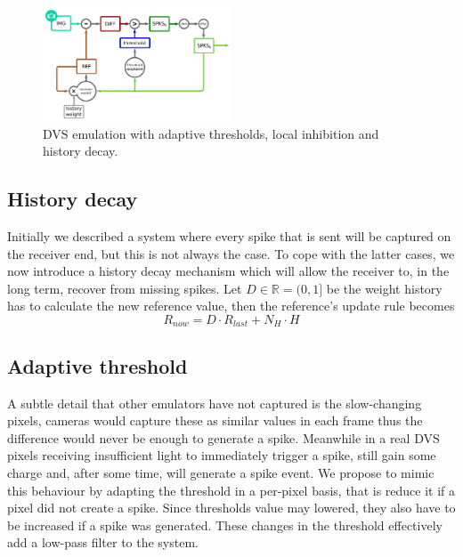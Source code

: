 \documentclass[conference]{IEEEtran}
\begin{document}
\begin{figure}[htb]
  
  \includegraphics[width=0.5\textwidth]{dvs_emu_decay_adapt_inh}
  \caption{DVS emulation with adaptive thresholds, local inhibition and history decay.}
  \label{fig:dvs_emu_inh}
\end{figure}

\subsection{History decay} %

Initially we described a system where every spike that is sent will be captured on the receiver end, but this is not always the case. To cope with the latter cases, we now introduce a history decay mechanism which will allow the receiver to, in the long term, recover from missing spikes. Let $D \in \mathbb{R} = (0, 1]$ be the weight history has to calculate the new reference value, then the reference's update rule becomes
\begin{equation}
\label{eq:ref_update_decay}
R_{now} = D\cdot R_{last} + N_{H}\cdot H
\end{equation}

%

\subsection{Adaptive threshold} 
A subtle detail that other emulators have not captured is the slow-changing pixels, cameras would capture these as similar values in each frame thus the difference would never be enough to generate a spike. Meanwhile in a real DVS pixels receiving insufficient light to immediately trigger a spike, still gain some charge and, after some time, will generate a spike event. We propose to mimic this behaviour by adapting the threshold in a per-pixel basis, that is reduce it if a pixel did not create a spike. Since thresholds value may lowered, they also have to be increased if a spike was generated. These changes in the threshold effectively add a low-pass filter to the system. 
\end{document}
